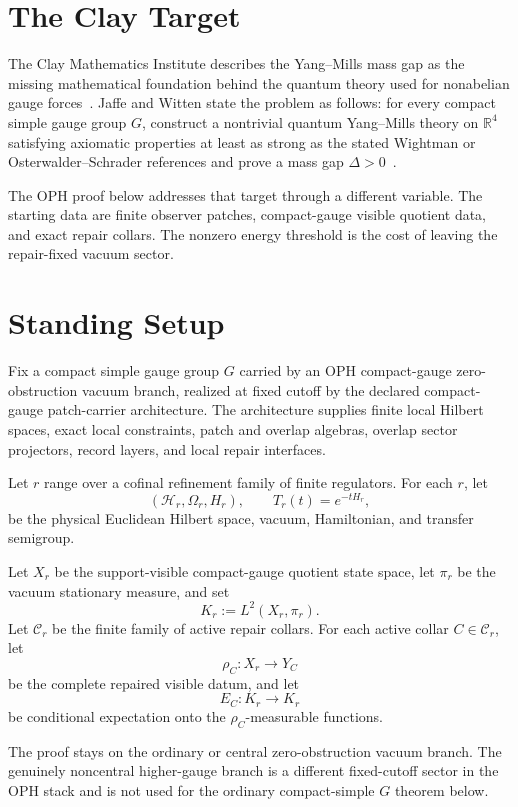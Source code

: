 \documentclass[11pt]{article}
\numberwithin{equation}{section}
\theoremstyle{remark}
\newcommand{\Hcal}{\mathcal H}
\newcommand{\R}{\mathbb R}
\begin{document}
\section{The Clay Target}

The Clay Mathematics Institute describes the Yang--Mills mass gap as the missing mathematical
foundation behind the quantum theory used for nonabelian gauge forces~\cite{clay}. Jaffe and
Witten state the problem as follows: for every compact simple gauge group \(G\), construct a
nontrivial quantum Yang--Mills theory on \(\R^4\) satisfying axiomatic properties at least as
strong as the stated Wightman or Osterwalder--Schrader references and prove a mass gap
\(\Delta>0\)~\cite{jaffe-witten,clay-mpp}.

The OPH proof below addresses that target through a different variable. The starting data are finite observer patches,
compact-gauge visible quotient data, and exact repair collars. The nonzero energy threshold is
the cost of leaving the repair-fixed vacuum sector.

\section{Standing Setup}

Fix a compact simple gauge group \(G\) carried by an OPH compact-gauge zero-obstruction vacuum
branch, realized at fixed cutoff by the declared compact-gauge patch-carrier architecture. The
architecture supplies finite local Hilbert spaces, exact local constraints, patch and overlap
algebras, overlap sector projectors, record layers, and local repair interfaces.

Let \(r\) range over a cofinal refinement family of finite regulators. For each \(r\), let
\[
(\Hcal_r,\Omega_r,H_r),
\qquad
T_r(t)=e^{-tH_r},
\]
be the physical Euclidean Hilbert space, vacuum, Hamiltonian, and transfer semigroup.

Let \(X_r\) be the support-visible compact-gauge quotient state space, let \(\pi_r\) be the
vacuum stationary measure, and set
\[
K_r:=L^2(X_r,\pi_r).
\]
Let \(\mathcal C_r\) be the finite family of active repair collars. For each active collar
\(C\in\mathcal C_r\), let
\[
\rho_C:X_r\to Y_C
\]
be the complete repaired visible datum, and let
\[
E_C:K_r\to K_r
\]
be conditional expectation onto the \(\rho_C\)-measurable functions.

The proof stays on the ordinary or central zero-obstruction vacuum branch. The genuinely
noncentral higher-gauge branch is a different fixed-cutoff sector in the OPH stack and is not
used for the ordinary compact-simple \(G\) theorem below.
\end{document}
